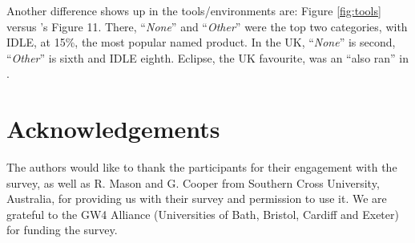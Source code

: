 \documentclass{sig-alternate}
\begin{document}
Another difference shows up in the tools/environments are: Figure
\ref{fig:tools} versus \cite{mason+cooper:2014}'s Figure 11. There,
``{\emph{None}}'' and ``{\emph{Other}}'' were the top two categories,
with IDLE, at 15\%, the most popular named product. In the UK,
``{\emph{None}}'' is second, ``{\emph{Other}}'' is sixth and IDLE
eighth. Eclipse, the UK favourite, was an ``also ran'' in \cite{mason+cooper:2014}.


\section{Acknowledgements}

The authors would like to thank the participants for their engagement
with the survey, as well as R. Mason and G. Cooper from Southern Cross
University, Australia, for providing us with their survey and
permission to use it.
We are grateful to the GW4 Alliance (Universities of Bath, Bristol,
Cardiff and Exeter) for funding the  survey.  %


\end{document}
